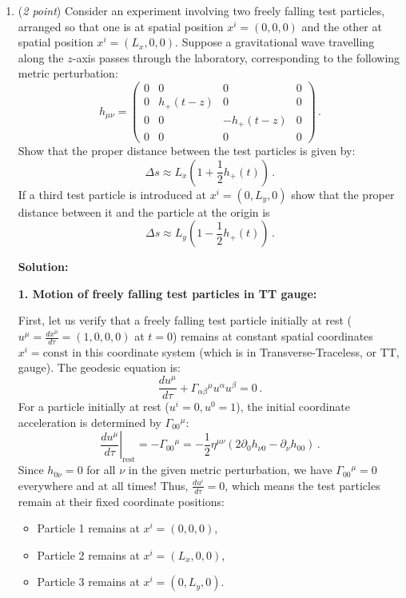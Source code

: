 \documentclass[12pt]{article}
\newcommand{\be}{\begin{equation}}
\newcommand{\ee}{\end{equation}}
\begin{document}
\begin{enumerate}[label=\alph*)]
\item (\emph{2 point}) Consider an experiment involving two freely falling test particles, arranged so that one is at spatial position $x^i = (0,0,0)$ and the other at spatial position $x^i=(L_x,0,0)$.
Suppose a gravitational wave travelling along the $z$-axis passes through the laboratory, corresponding to the following metric perturbation:
\be
h_{\mu\nu} = \begin{pmatrix}
0 & 0 & 0 & 0 \\
0 & h_{+}(t-z) & 0 & 0 \\
0 & 0 & - h_{+}(t-z) & 0 \\
0 & 0 & 0 & 0
\end{pmatrix} \,.
\ee
Show that the proper distance between the test particles is given by: 
\be
\Delta s \approx L_x \left( 1 + \frac{1}{2} h_{+}(t) \right) \,.
\ee
If a third test particle is introduced at $x^i=(0,L_y,0)$ show that the proper distance between it and the particle at the origin is
\be
\Delta s \approx L_y \left( 1 - \frac{1}{2} h_{+}(t) \right) \,.
\ee

\medskip
\noindent\textbf{Solution:}

\noindent\textbf{1. Motion of freely falling test particles in TT gauge:}

First, let us verify that a freely falling test particle initially at rest ($u^\mu = \frac{dx^\mu}{d\tau} = (1,0,0,0)$ at $t = 0$) remains at constant spatial coordinates $x^i = \text{const}$ in this coordinate system (which is in Transverse-Traceless, or TT, gauge). The geodesic equation is:
\be
\frac{d u^\mu}{d\tau} + \Gamma_{\alpha\beta}{}^\mu u^\alpha u^\beta = 0 \,.
\ee
For a particle initially at rest ($u^i = 0, u^0 = 1$), the initial coordinate acceleration is determined by $\Gamma_{00}{}^\mu$:
\be
\left.\frac{d u^\mu}{d\tau}\right|_{\text{rest}} = -\Gamma_{00}{}^\mu = -\frac{1}{2} \eta^{\mu\nu} \left( 2 \partial_0 h_{\nu 0} - \partial_\nu h_{00} \right) \,.
\ee
Since $h_{0\nu} = 0$ for all $\nu$ in the given metric perturbation, we have $\Gamma_{00}{}^\mu = 0$ everywhere and at all times! Thus, $\frac{du^i}{d\tau} = 0$, which means the test particles remain at their fixed coordinate positions:
\begin{itemize}
\item Particle 1 remains at $x^i = (0,0,0)$,
\item Particle 2 remains at $x^i = (L_x,0,0)$,
\item Particle 3 remains at $x^i = (0,L_y,0)$.
\end{itemize}


\end{enumerate}
\end{document}
